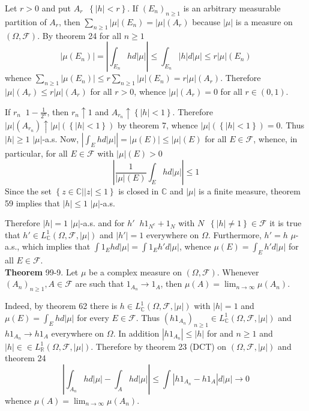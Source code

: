\documentclass[a4paper]{article}
\newcommand{\obj}[1]{\left\{ #1 \right \}}
\newcommand{\brac}[1]{\left ( #1 \right )}
\newcommand{\induc}[1]{\left . #1 \right \vert}
\newcommand{\abs}[1]{\left | #1 \right |}
\newcommand{\Real}{\mathbb{R}}
\newcommand{\Cplx}{\mathbb{C}}
\newcommand{\Fcal}{\mathcal{F}}
\newcommand{\defn}{\mathop{\overset{\Delta}{=}}\nolimits}
\begin{document}
Let $r>0$ and put $A_r\defn \obj{\abs{h}<r}$. If $\brac{E_n}_{n\geq 1}$ is an arbitrary measurable partition of $A_r$, then $\sum_{n\geq 1}\abs{\mu}\brac{E_n}=\abs{\mu}\brac{A_r}$ because $\abs{\mu}$ is a measure on $\brac{\Omega, \Fcal}$. By theorem 24 for all $n\geq 1$ \[\abs{\mu\brac{E_n}} = \abs{\int_{E_n} h d\abs{\mu}}\leq \int_{E_n} \abs{h} d\abs{\mu} \leq r \abs{\mu}\brac{E_n}\] whence $\sum_{n\geq 1}\abs{\mu\brac{E_n}}\leq r \sum_{n\geq 1} \abs{\mu}\brac{E_n} = r \abs{\mu}\brac{A_r}$. Therefore $\abs{\mu}\brac{A_r}\leq r \abs{\mu}\brac{A_r}$ for all $r>0$, whence $\abs{\mu}\brac{A_r}=0$ for all $r\in\brac{0,1}$.

If $r_n\defn 1-\frac{1}{2^n}$, then $r_n\uparrow 1$ and $A_{r_n}\uparrow \obj{\abs{h}<1}$. Therefore $\abs{\mu}\brac{A_{r_n}}\uparrow\abs{\mu}\brac{\obj{\abs{h}<1}}$ by theorem 7, whence $\abs{\mu}\brac{\obj{\abs{h}<1}}=0$. Thus $\abs{h}\geq 1$ $\abs{\mu}$-a.s. Now, $\abs{\int_E h d\abs{\mu}} = \abs{\mu\brac{E}} \leq \abs{\mu}\brac{E}$ for all $E\in \Fcal$, whence, in particular, for all $E\in \Fcal$ with $\abs{\mu}\brac{E}>0$ \[\abs{ \frac{1}{\abs{\mu}\brac{E}} \int_E h d\abs{\mu} } \leq 1\] Since the set $\obj{\induc{z\in \Cplx} \abs{z}\leq1}$ is closed in $\Cplx$ and $\abs{\mu}$ is a finite measure, theorem 59 implies that $\abs{h}\leq 1$ $\abs{\mu}$-a.s.

Therefore $\abs{h}=1$ $\abs{\mu}$-a.s. and for $h'\defn h 1_{N^c} + 1_N$ with $N\defn \obj{\abs{h}\neq1}\in \Fcal$ it is true that $h'\in L^1_\Cplx\brac{\Omega, \Fcal, \abs{\mu}}$ and $\abs{h'}=1$ everywhere on $\Omega$. Furthermore, $h'=h$ $\mu$-a.s., which implies that $\int 1_E h d\abs{\mu}=\int 1_E h' d\abs{\mu}$, whence $\mu\brac{E} = \int_E h' d\abs{\mu}$ for all $E\in \Fcal$.\\


\label{thm:cplx_meas_cont} \noindent \textbf{Theorem} 99-9.
Let $\mu$ be a complex measure on $\brac{\Omega, \Fcal}$. Whenever $\brac{A_n}_{n\geq 1}, A\in \Fcal$ are such that $1_{A_n}\to 1_A$, then $\mu\brac{A} = \lim_{n\to\infty} \mu\brac{A_n}$.

Indeed, by theorem 62 there is $h\in L^1_\Cplx\brac{\Omega, \Fcal, \abs{\mu}}$ with $\abs{h}=1$ and $\mu\brac{E} = \int_E h d\abs{\mu}$ for every $E\in \Fcal$. Thus $\brac{h 1_{A_n}}_{n\geq1}\in L^1_\Cplx\brac{\Omega, \Fcal, \abs{\mu}}$ and $h 1_{A_n}\to h 1_A$ everywhere on $\Omega$. In addition $\abs{h 1_{A_n}} \leq \abs{h}$ for and $n\geq 1$ and $\abs{h}\in \in L^1_\Real\brac{\Omega, \Fcal, \abs{\mu}}$. Therefore by theorem 23 (DCT) on $\brac{\Omega, \Fcal, \abs{\mu}}$ and theorem 24 \[\abs{\int_{A_n} h d\abs{\mu} - \int_A h d\abs{\mu}}\leq \int \abs{h 1_{A_n} - h 1_A} d\abs{\mu} \to 0\] whence $\mu\brac{A} = \lim_{n\to\infty} \mu\brac{A_n}$.\\
\end{document}
